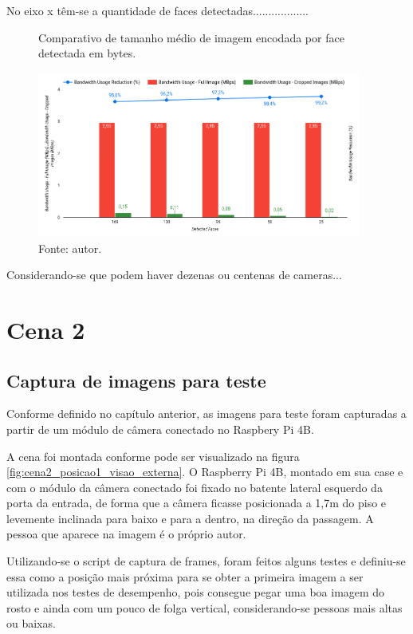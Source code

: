 No eixo x têm-se a quantidade de faces detectadas..................

\begin{figure}
    \centering
    \caption[Comparativo de tamanho médio de imagem encodada por face detectada em bytes.]{Comparativo de tamanho médio de imagem encodada por face detectada em bytes.}
    \includegraphics[width=0.95\textwidth]{Cap4_Experimentos_Realizados/Figures/cena1_comparativo_utilizacao_banda.jpg}
    \caption*{Fonte: autor.}
    \label{fig:cena1_comparativo_utilizacao_banda}
\end{figure}

Considerando-se que podem haver dezenas ou centenas de cameras...

\section{Cena 2}

\subsection{Captura de imagens para teste}

Conforme definido no capítulo anterior, as imagens para teste foram capturadas a partir de um módulo de câmera conectado no Raspbery Pi 4B.

A cena foi montada conforme pode ser visualizado na figura \ref{fig:cena2_posicao1_visao_externa}. O Raspberry Pi 4B, montado em sua case e com o módulo da câmera conectado foi fixado no batente lateral esquerdo da porta da entrada, de forma que a câmera ficasse posicionada a 1,7m do piso e levemente inclinada para baixo e para a dentro, na direção da passagem. A pessoa que aparece na imagem é o próprio autor.

Utilizando-se o script de captura de frames, foram feitos alguns testes e definiu-se essa como a posição mais próxima para se obter a primeira imagem a ser utilizada nos testes de desempenho, pois consegue pegar uma boa imagem do rosto e ainda com um pouco de folga vertical, considerando-se pessoas mais altas ou baixas.

